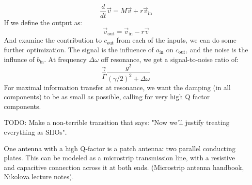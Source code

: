 \documentclass[final]{article}
\begin{document}
\[\frac{d}{dt} \vec v=M\vec v+r\vec v_{\text{in}}\]
If we define the output as:
\[\vec v_{\text{out}}=\vec v_{\text{in}}-r \vec v\]
And examine the contribution to \(c_{\text{out}}\) from each of the inputs, we can do some further optimization.
The signal is the influence of \(a_{\text{in}}\) on \(c_{\text{out}}\), and the noise is the influnce of \(b_{\text{in}}\).
At frequency \(\Delta \omega\) off resonance, we get a signal-to-noise ratio of:
\[\frac{\gamma}{\Gamma}\frac{g^2}{(\gamma/2)^2+\Delta \omega}\]
For maximal information transfer at resonance, we want the damping (in all components) to be as small as possible, calling for very high Q factor components.

TODO: Make a non-terrible transition that says: "Now we'll justify treating everything as SHOs".

One antenna with a high Q-factor is a patch antenna: two parallel conducting plates.
This can be modeled as a microstrip transmission line, with a resistive and capacitive connection across it at both ends. (Microstrip antenna handbook, Nikolova lecture notes).
\end{document}
